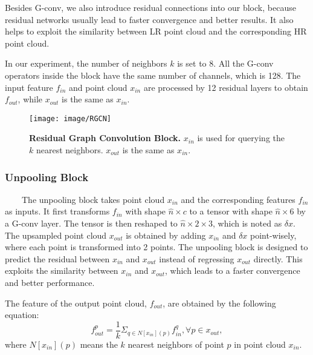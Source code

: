 \documentclass[10pt,twocolumn,letterpaper]{article}
\begin{document}
Besides G-conv, we also introduce residual connections into our block, because residual networks usually lead to faster convergence and better results.
It also helps to exploit the similarity between LR point cloud and the corresponding HR point cloud.

In our experiment, the number of neighbors $k$ is set to 8.
All the G-conv operators inside the block have the same number of channels, which is 128.
The input feature $f_{in}$ and point cloud $x_{in}$ are processed by 12 residual layers to obtain $f_{out}$, while $x_{out}$ is the same as $x_{in}$.

\begin{figure}
\begin{center}
    \texttt{[image: image/RGCN]}
\end{center}
	\vspace{-1.5em}
	\caption{\textbf{Residual Graph Convolution Block.} $x_{in}$ is used for querying the $k$ nearest neighbors. $x_{out}$ is the same as $x_{in}$.}
	\vspace{-1em}
	\label{fig:rgcn}
\end{figure}

\subsubsection{Unpooling Block}
~~~~The unpooling block takes point cloud $x_{in}$ and the corresponding features $f_{in}$ as inputs.
It first transforms $f_{in}$ with shape $\hat{n}\times c$ to a tensor with shape $\hat{n} \times 6$ by a G-conv layer.
The tensor is then reshaped to $\hat{n}\times 2\times 3$, which is noted as $\delta x$.
The upsampled point cloud $x_{out}$ is obtained by adding $x_{in}$ and $\delta x$ point-wisely, where each point is transformed into 2 points.
The unpooling block is designed to predict the residual between $x_{in}$ and $x_{out}$ instead of regressing $x_{out}$ directly.
This exploits the similarity between $x_{in}$ and $x_{out}$, which leads to a faster convergence and better performance.

The feature of the output point cloud, $f_{out}$, are obtained by the following equation:
\begin{equation}
    f_{out}^p = \frac{1}{k}\Sigma_{q\in N[x_{in}](p)}f_{in}^q, \forall p \in x_{out},
\end{equation}
where $N[x_{in}](p)$ means the $k$ nearest neighbors of point $p$ in point cloud $x_{in}$.
\end{document}
